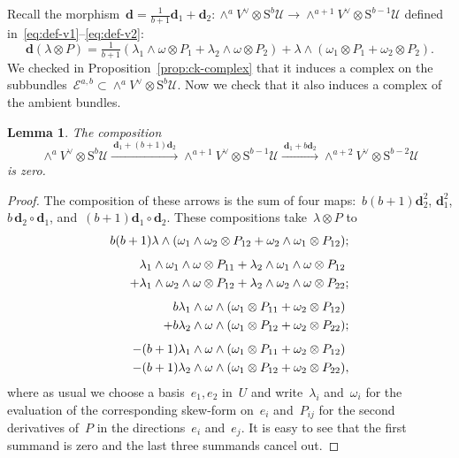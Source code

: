 \documentclass[a4paper]{article}
\newcommand{\cE}{\mathcal{E}}
\newcommand{\cU}{\mathcal{U}}
\newcommand{\Sy}{\mathrm{S}}
\newcommand{\vn}{\mathbf{d}}
\newtheorem{lemma}[theorem]{Lemma}
\theoremstyle{remark}
\theoremstyle{definition}
\begin{document}
Recall the morphism~\(\vn = \tfrac1{b+1}\vn_1 + \vn_2 \colon \wedge^{a} V^\vee \otimes \Sy^{b} \cU \to \wedge^{a + 1} V^\vee \otimes \Sy^{b - 1} \cU\)
defined in~\eqref{eq:def-v1}--\eqref{eq:def-v2}:
\begin{equation*}
\vn(\lambda \otimes P) = 
\tfrac1{b+1}(\lambda_1 \wedge \omega \otimes P_1 + 
\lambda_2 \wedge \omega \otimes P_2) + 
\lambda \wedge (\omega_1 \otimes P_1 + \omega_2 \otimes P_2).
\end{equation*}
We checked in Proposition~\ref{prop:ck-complex} that it induces a complex on the subbundles~\(\cE^{a,b} \subset \wedge^{a} V^\vee \otimes \Sy^{b} \cU\).
Now we check that it also induces a complex of the ambient bundles.

\begin{lemma}
The composition
\begin{equation*}
\wedge^{a} V^\vee \otimes \Sy^{b} \cU \xrightarrow{\ \vn_1 + (b + 1)\vn_2\ }
\wedge^{a + 1} V^\vee \otimes \Sy^{b - 1} \cU \xrightarrow{\ \vn_1 + b\vn_2\ }
\wedge^{a + 2} V^\vee \otimes \Sy^{b - 2} \cU
\end{equation*}
is zero.
\end{lemma}

\begin{proof}
The composition of these arrows is the sum of four maps:~\(b(b+1)\vn_2^2\), \(\vn_1^2\), 
\(b \, \vn_2 \circ \vn_1\), and~\((b+1)\vn_1 \circ \vn_2\). 
These compositions take~\(\lambda \otimes P\) to
\begin{align*}
b(b + 1)\lambda \wedge (\omega_1 \wedge \omega_2 \otimes P_{12} + \omega_2 \wedge \omega_1 \otimes P_{12});
\\[1ex]
\lambda_1 \wedge \omega_1 \wedge \omega \otimes P_{11} 
+ \lambda_2 \wedge \omega_1 \wedge \omega \otimes P_{12}\hphantom{;}
\\
+ \lambda_1 \wedge \omega_2 \wedge \omega \otimes P_{12} 
+ \lambda_2 \wedge \omega_2 \wedge \omega \otimes P_{22};
\\[1ex]
b\lambda_1 \wedge \omega \wedge (\omega_1 \otimes P_{11} + \omega_2 \otimes P_{12})\hphantom{;} 
\\
+ b\lambda_2 \wedge \omega \wedge (\omega_1 \otimes P_{12} + \omega_2 \otimes P_{22});
\\[1ex]
- (b + 1)\lambda_1 \wedge \omega \wedge (\omega_1 \otimes P_{11} + \omega_2 \otimes P_{12})\hphantom{;}
\\
- (b + 1)\lambda_2 \wedge \omega \wedge (\omega_1 \otimes P_{12} + \omega_2 \otimes P_{22}),
\end{align*}
where as usual we choose a basis~\(e_1,e_2\) in~\(U\) and write~\(\lambda_i\) and~\(\omega_i\) 
for the evaluation of the corresponding skew-form on~\(e_i\) 
and~\(P_{ij}\) for the second derivatives of~\(P\) in the directions~\(e_i\) and~\(e_j\).
It is easy to see that the first summand is zero and the last three summands cancel out.
\end{proof}
\end{document}
